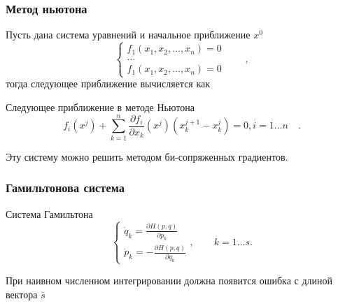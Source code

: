 \documentclass[t]{beamer}
\begin{document}
\ITMOthankspage


\begin{frame}[noframenumbering]
    \frametitle{Метод ньютона}
    Пусть дана система уравнений и начальное приближение $x^0$
    \begin{equation*}\label{eq:newton-needed-form}
        \begin{cases}
            f_1(x_1, x_2,\dots, x_n) = 0\\
            \dots\\
            f_1(x_1, x_2,\dots, x_n) = 0
        \end{cases} \qquad ,
    \end{equation*}
    тогда следующее приближение вычисляется как
    \begin{block}{Следующее приближение в методе Ньютона}
        \begin{equation*}\label{eq:newton-generalized-iteration}
            f_i(x^j) + \sum_{k=1}^n \frac{\partial f_i}{\partial x_k}(x^j)
            (x_k^{j+1}-x_k^{j}) = 0,  i=1\dots n \quad .
        \end{equation*}
    \end{block}
    Эту систему можно решить методом би-сопряженных градиентов.
\end{frame}


\begin{frame}[noframenumbering]
    \frametitle{Гамильтонова система}
    \begin{block}{Система Гамильтона}
        \begin{equation*}
            \begin{cases}
                \dot q_k = \frac{\partial H(p, q)}{\partial p_k}\\
                \dot p_k = -\frac{\partial H(p, q)}{\partial q_k}
            \end{cases}, \qquad k = 1\dots s.
        \end{equation*}
    \end{block}
    При наивном численном интегрировании должна появится ошибка с длиной
    вектора $\bar{s}$
    {%
        \begin{figure}[h]
        \end{figure}
    }
\end{frame}
\end{document}
